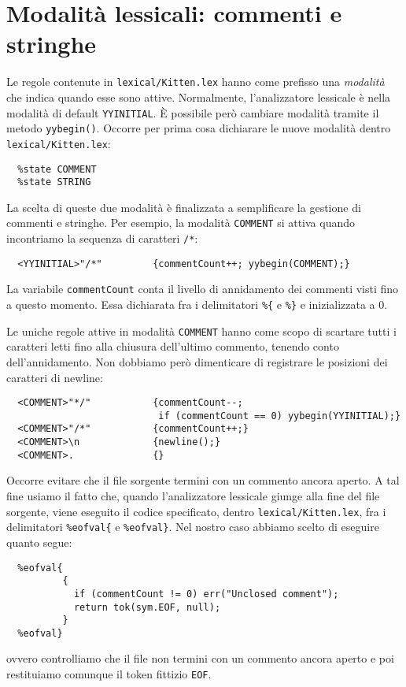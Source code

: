 \section{Modalit\`a lessicali: commenti e stringhe}\label{sec:modes}
%
Le regole contenute in \texttt{lexical/Kitten.lex} hanno come
prefisso una \emph{modalit\`a} che indica quando esse sono attive. Normalmente,
l'analizzatore lessicale \`e nella modalit\`a di default \texttt{YYINITIAL}.
\`E possibile per\`o cambiare modalit\`a tramite il metodo
\texttt{yybegin()}. Occorre per prima cosa dichiarare le nuove modalit\`a
dentro \texttt{lexical/Kitten.lex}:
%
\begin{verbatim}
  %state COMMENT
  %state STRING
\end{verbatim}
%
La scelta di queste due modalit\`a \`e finalizzata a semplificare la
gestione di commenti e stringhe. Per esempio,
la modalit\`a \texttt{COMMENT} si attiva quando incontriamo la sequenza
di caratteri \texttt{/*}:
%
\begin{verbatim}
  <YYINITIAL>"/*"         {commentCount++; yybegin(COMMENT);}
\end{verbatim}
%
La variabile \texttt{commentCount} conta il livello di annidamento
dei commenti visti fino a questo momento. Essa \e dichiarata fra i
delimitatori \verb!%{! e \verb!%}! e inizializzata a $0$.

Le uniche regole attive in modalit\`a \texttt{COMMENT} hanno come scopo
di scartare tutti i caratteri letti fino alla chiusura dell'ultimo
commento, tenendo conto dell'annidamento. Non dobbiamo per\`o dimenticare
di registrare le posizioni dei caratteri di newline:
%
\begin{verbatim}
  <COMMENT>"*/"           {commentCount--;
                           if (commentCount == 0) yybegin(YYINITIAL);}
  <COMMENT>"/*"           {commentCount++;}
  <COMMENT>\n             {newline();}
  <COMMENT>.              {}
\end{verbatim}

Occorre evitare che il file sorgente termini con un commento
ancora aperto. A tal fine usiamo il fatto che,
quando l'analizzatore lessicale giunge alla fine del file sorgente,
viene eseguito il codice specificato, dentro \texttt{lexical/Kitten.lex},
fra i delimitatori \texttt{\%eofval\{} e \texttt{\%eofval\}}. Nel nostro
caso abbiamo scelto di eseguire quanto segue:
%
\begin{verbatim}
  %eofval{
          {
            if (commentCount != 0) err("Unclosed comment");
            return tok(sym.EOF, null);
          }
  %eofval}
\end{verbatim}
%
ovvero controlliamo che il file non termini con un commento ancora aperto e
poi restituiamo comunque il token fittizio \texttt{EOF}.

